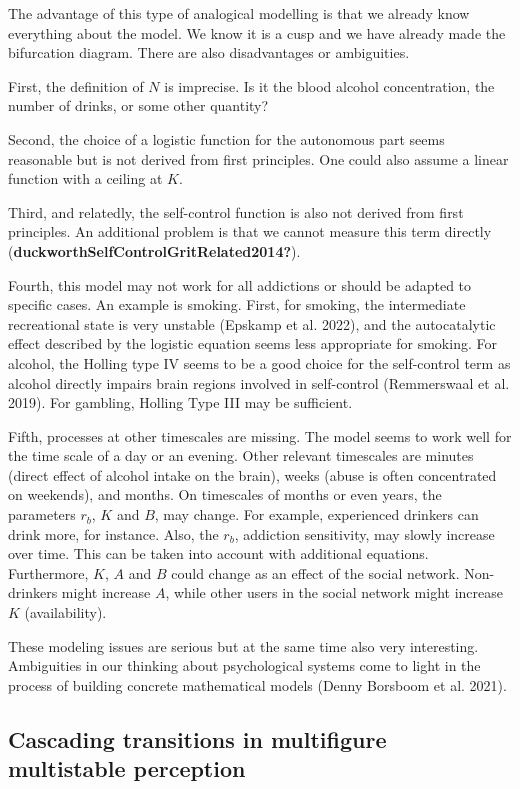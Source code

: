 \documentclass[
  letterpaper,
]{scrbook}
\begin{document}
The advantage of this type of analogical modelling is that we already
know everything about the model. We know it is a cusp and we have
already made the bifurcation diagram. There are also disadvantages or
ambiguities.

First, the definition of \(N\) is imprecise. Is it the blood alcohol
concentration, the number of drinks, or some other quantity?

Second, the choice of a logistic function for the autonomous part seems
reasonable but is not derived from first principles. One could also
assume a linear function with a ceiling at \(K\).

Third, and relatedly, the self-control function is also not derived from
first principles. An additional problem is that we cannot measure this
term directly (\textbf{duckworthSelfControlGritRelated2014?}).

Fourth, this model may not work for all addictions or should be adapted
to specific cases. An example is smoking. First, for smoking, the
intermediate recreational state is very unstable (Epskamp et al. 2022),
and the autocatalytic effect described by the logistic equation seems
less appropriate for smoking. For alcohol, the Holling type IV seems to
be a good choice for the self-control term as alcohol directly impairs
brain regions involved in self-control (Remmerswaal et al. 2019). For
gambling, Holling Type III may be sufficient.

Fifth, processes at other timescales are missing. The model seems to
work well for the time scale of a day or an evening. Other relevant
timescales are minutes (direct effect of alcohol intake on the brain),
weeks (abuse is often concentrated on weekends), and months. On
timescales of months or even years, the parameters \(r_{b}\), \(K\) and
\(B\), may change. For example, experienced drinkers can drink more, for
instance. Also, the \(r_{b}\), addiction sensitivity, may slowly
increase over time. This can be taken into account with additional
equations. Furthermore, \(K\), \(A\) and \(B\) could change as an effect
of the social network. Non-drinkers might increase \(A\), while other
users in the social network might increase \(K\) (availability).

These modeling issues are serious but at the same time also very
interesting. Ambiguities in our thinking about psychological systems
come to light in the process of building concrete mathematical models
(Denny Borsboom et al. 2021).

\hypertarget{cascading-transitions-in-multifigure-multistable-perception}{%
\subsection{Cascading transitions in multifigure multistable
perception}\label{cascading-transitions-in-multifigure-multistable-perception}}
\end{document}
